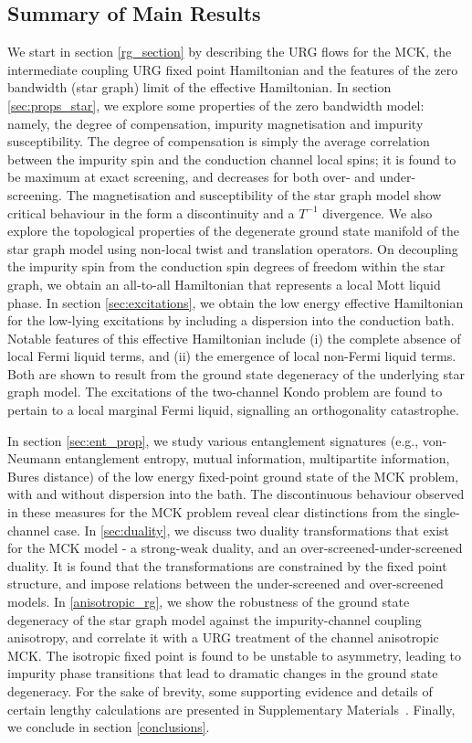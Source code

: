 \documentclass[reprint,prb,superscriptaddress]{revtex4-2}
\begin{document}
\subsection*{Summary of Main Results}
We start in section \ref{rg_section} by describing the URG flows for the MCK, the intermediate coupling URG fixed point Hamiltonian and the features of the zero bandwidth (star graph) limit of the effective Hamiltonian.
In section \ref{sec:props_star}, we explore some properties of the zero bandwidth model: namely, the degree of compensation, impurity magnetisation and impurity susceptibility.
The degree of compensation is simply the average correlation between the impurity spin and the conduction channel local spins; it is found to be maximum at exact screening, and decreases for both over- and under-screening.
The magnetisation and susceptibility of the star graph model show {\color{red}critical behaviour in the form} a discontinuity and a \(T^{-1}\) divergence.
We also explore the topological properties of the degenerate ground state manifold of the star graph model using non-local twist and translation operators.
On decoupling the impurity spin from the conduction spin degrees of freedom within the star graph, we obtain an all-to-all Hamiltonian that represents a local Mott liquid phase.
In section \ref{sec:excitations}, we obtain the low energy effective Hamiltonian for the low-lying excitations by including a dispersion into the conduction bath.
Notable features of this effective Hamiltonian include (i) the complete absence of local Fermi liquid terms, and (ii) the emergence of local non-Fermi liquid terms.
Both are shown to result from the ground state degeneracy of the underlying star graph model.
The excitations of the two-channel Kondo problem are found to pertain to a local marginal Fermi liquid, signalling an orthogonality catastrophe. 

In section \ref{sec:ent_prop}, we study various entanglement signatures (e.g., von-Neumann entanglement entropy, mutual information, multipartite information, Bures distance) of the low energy fixed-point ground state of the MCK problem, with and without dispersion into the bath. The discontinuous behaviour observed in these measures for the MCK problem reveal clear distinctions from the single-channel case. In \ref{sec:duality}, we discuss two duality transformations that exist for the MCK model - a strong-weak duality, and an over-screened-under-screened duality. It is found that the transformations are constrained by the fixed point structure, and impose relations between the under-screened and over-screened models.
In \ref{anisotropic_rg}, we show the robustness of the ground state degeneracy of the star graph model against the impurity-channel coupling anisotropy, and correlate it with a URG treatment of the channel anisotropic MCK.
The isotropic fixed point is found to be unstable to asymmetry, leading to impurity phase transitions that lead to dramatic changes in the ground state degeneracy.
For the sake of brevity, some supporting evidence and details of certain lengthy calculations are presented in Supplementary Materials~\cite{SM}. Finally, we conclude in section \ref{conclusions}.
\end{document}
